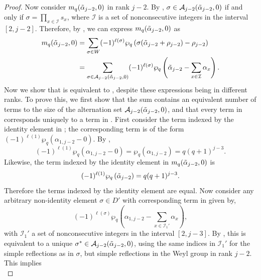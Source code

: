 \documentclass[10pt]{article}
\newcommand{\hr}[0]{\Tilde{\alpha}}
\newcommand{\qpartition}[1]{\wp_q\left(#1\right)}
\begin{document}
\begin{proof}
    Now consider $m_q(\hr_{j-2},0)$ in rank $j-2$. By , $\sigma\in\mathcal{A}_{j-2}(\hr_{j-2},0)$ if and only if $\sigma=\prod_{x\in\mathcal{I}}s_x$, where $\mathcal{I}$ is a set of nonconsecutive integers in the interval $[2,j-2]$. Therefore, by , we can express $m_q(\hr_{j-2},0)$ as
    \begin{align}
        m_q(\hr_{j-2},0) &= \sum_{\sigma \in W}(-1)^{\ell(\sigma)}\qpartition{\sigma(\hr_{j-2}+\rho_{j-2})-\rho_{j-2}} \notag \\
        &= \sum_{\sigma\in\mathcal{A}_{j-2}(\hr_{j-2},0)}(-1)^{\ell(\sigma)}\qpartition{\hr_{j-2}-\sum_{x\in\mathcal{I}}\alpha_x}\label{zero weight for D'}.
    \end{align}
    Now we show that  is equivalent to , despite these expressions being in different ranks. To prove this, we first show that the sum contains an equivalent number of terms to the size of the alternation set $\mathcal{A}_{j-2}(\hr_{j-2},0)$, and that every term in  corresponds uniquely to a term in . First consider the term indexed by the identity element in ; the corresponding term is of the form $(-1)^{\ell(1)}\qpartition{\alpha_{1,j-2}-0}$. By ,
    \begin{equation*}
        (-1)^{\ell(1)}\qpartition{\alpha_{1,j-2}-0}=\qpartition{\alpha_{1,j-2}}=q(q+1)^{j-3}.
    \end{equation*}
    Likewise, the term indexed by the identity element in $m_q(\hr_{j-2},0)$ is
    \begin{equation*}
        (-1)^{\ell(1)}\qpartition{\hr_{j-2}}=q(q+1)^{j-3}.
    \end{equation*}
    Therefore the terms indexed by the identity element are equal. Now consider any arbitrary non-identity element $\sigma\in D'$ with corresponding term in  given by,
    \begin{equation*}
        (-1)^{\ell(\sigma)}\qpartition{\alpha_{1,j-2}-\sum_{x\in\mathcal{I}_1'}\alpha_x},
    \end{equation*}
    with $\mathcal{I}_1'$ a set of nonconsecutive integers in the interval $[2,j-3]$. By , this is equivalent to a unique $\sigma^*\in\mathcal{A}_{j-2}(\hr_{j-2},0)$, using the same indices in $\mathcal{I}_1'$ for the simple reflections as in $\sigma$, but simple reflections in the Weyl group in rank $j-2$. This implies
    \begin{equation*}

\end{equation*}
\end{proof}
\end{document}
